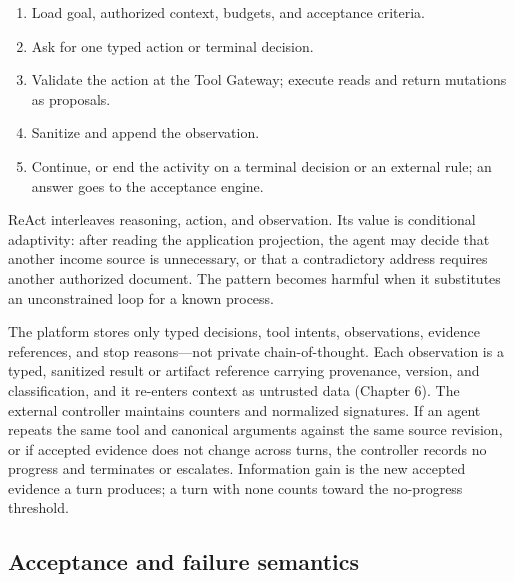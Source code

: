 \begin{enumerate}

\item Load goal, authorized context, budgets, and acceptance criteria.

\item Ask for one typed action or terminal decision.

\item Validate the action at the Tool Gateway; execute reads and return mutations as proposals.

\item Sanitize and append the observation.

\item Continue, or end the activity on a terminal decision or an external rule; an answer goes to the acceptance engine.

\end{enumerate}

ReAct interleaves reasoning, action, and observation. Its value is conditional adaptivity: after reading the application projection, the agent may decide that another income source is unnecessary, or that a contradictory address requires another authorized document. The pattern becomes harmful when it substitutes an unconstrained loop for a known process.\par

The platform stores only typed decisions, tool intents, observations, evidence references, and stop reasons—not private chain-of-thought. Each observation is a typed, sanitized result or artifact reference carrying provenance, version, and classification, and it re-enters context as untrusted data (Chapter 6). The external controller maintains counters and normalized signatures. If an agent repeats the same tool and canonical arguments against the same source revision, or if accepted evidence does not change across turns, the controller records no progress and terminates or escalates. Information gain is the new accepted evidence a turn produces; a turn with none counts toward the no-progress threshold.\par

\subsection{Acceptance and failure semantics}

